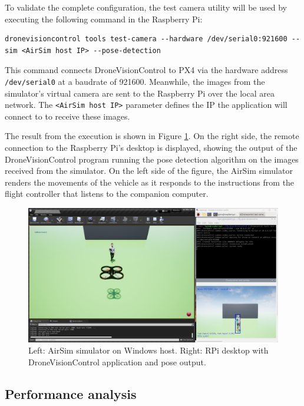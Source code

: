 To validate the complete configuration, the test camera utility will be used by executing the following command in the Raspberry Pi:

\begin{verbatim}
dronevisioncontrol tools test-camera --hardware /dev/serial0:921600 --sim <AirSim host IP> --pose-detection
\end{verbatim}

This command connects DroneVisionControl to PX4 via the hardware address \texttt{/dev/serial0} at a baudrate of 921600. Meanwhile, the images from the simulator's virtual camera are sent to the Raspberry Pi over the local area network. The \texttt{<AirSim host IP>} parameter defines the IP the application will connect to to receive these images.

The result from the execution is shown in Figure \ref{fig:rpi-airsim-test}. On the right side, the remote connection to the Raspberry Pi's desktop is displayed, showing the output of the DroneVisionControl program running the pose detection algorithm on the images received from the simulator. On the left side of the figure, the AirSim simulator renders the movements of the vehicle as it responds to the instructions from the flight controller that listens to the companion computer.

\begin{figure}[H]
  \centering
  \includegraphics[width=\textwidth, keepaspectratio]{img/airsim-rpi-test.png}
  \caption{Left: AirSim simulator on Windows host. Right: RPi desktop with DroneVisionControl application and pose output.}
  \label{fig:rpi-airsim-test}
\end{figure}


\subsection{Performance analysis}
\label{subsec:performance}

